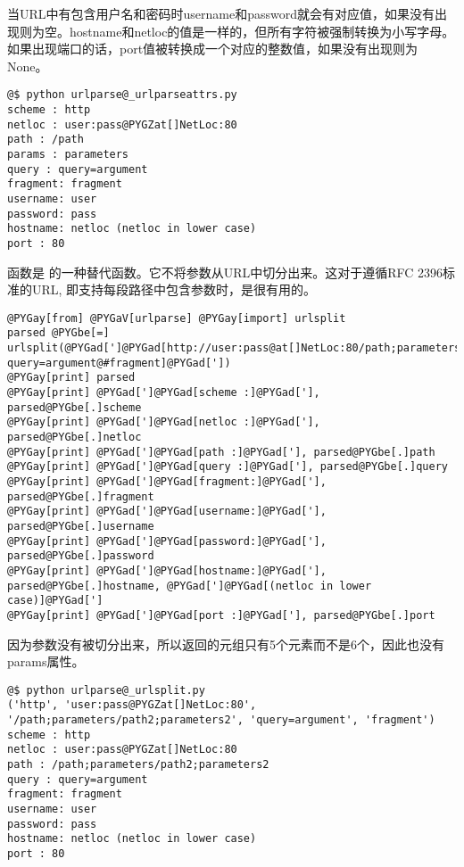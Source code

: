 \documentclass[a4paper,10pt,english]{manual}
\begin{document}
当URL中有包含用户名和密码时username和password就会有对应值，如果没有出现则为空。hostname和netloc的值是一样的，但所有字符被强制转换为小写字母。如果出现端口的话，port值被转换成一个对应的整数值，如果没有出现则为None。

\begin{Verbatim}[commandchars=@\[\]]
@$ python urlparse@_urlparseattrs.py
scheme : http
netloc : user:pass@PYGZat[]NetLoc:80
path : /path
params : parameters
query : query=argument
fragment: fragment
username: user
password: pass
hostname: netloc (netloc in lower case)
port : 80
\end{Verbatim}

 函数是  的一种替代函数。它不将参数从URL中切分出来。这对于遵循RFC 2396标准的URL, 即支持每段路径中包含参数时，是很有用的。

\begin{Verbatim}[commandchars=@\[\]]
@PYGay[from] @PYGaV[urlparse] @PYGay[import] urlsplit
parsed @PYGbe[=] urlsplit(@PYGad[']@PYGad[http://user:pass@at[]NetLoc:80/path;parameters/path2;parameters2?query=argument@#fragment]@PYGad['])
@PYGay[print] parsed
@PYGay[print] @PYGad[']@PYGad[scheme :]@PYGad['], parsed@PYGbe[.]scheme
@PYGay[print] @PYGad[']@PYGad[netloc :]@PYGad['], parsed@PYGbe[.]netloc
@PYGay[print] @PYGad[']@PYGad[path :]@PYGad['], parsed@PYGbe[.]path
@PYGay[print] @PYGad[']@PYGad[query :]@PYGad['], parsed@PYGbe[.]query
@PYGay[print] @PYGad[']@PYGad[fragment:]@PYGad['], parsed@PYGbe[.]fragment
@PYGay[print] @PYGad[']@PYGad[username:]@PYGad['], parsed@PYGbe[.]username
@PYGay[print] @PYGad[']@PYGad[password:]@PYGad['], parsed@PYGbe[.]password
@PYGay[print] @PYGad[']@PYGad[hostname:]@PYGad['], parsed@PYGbe[.]hostname, @PYGad[']@PYGad[(netloc in lower case)]@PYGad[']
@PYGay[print] @PYGad[']@PYGad[port :]@PYGad['], parsed@PYGbe[.]port
\end{Verbatim}

因为参数没有被切分出来，所以返回的元组只有5个元素而不是6个，因此也没有params属性。

\begin{Verbatim}[commandchars=@\[\]]
@$ python urlparse@_urlsplit.py
('http', 'user:pass@PYGZat[]NetLoc:80', '/path;parameters/path2;parameters2', 'query=argument', 'fragment')
scheme : http
netloc : user:pass@PYGZat[]NetLoc:80
path : /path;parameters/path2;parameters2
query : query=argument
fragment: fragment
username: user
password: pass
hostname: netloc (netloc in lower case)
port : 80
\end{Verbatim}
\end{document}
